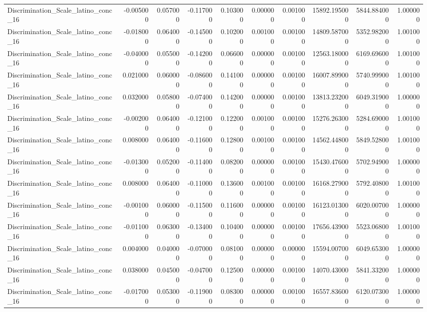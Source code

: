 \begin{table}
\begin{tabular}{lrrrrrrrrr}
Discrimination_Scale_latino_conc_16 & -0.005000 & 0.057000 & -0.117000 & 0.103000 & 0.000000 & 0.001000 & 15892.195000 & 5844.884000 & 1.000000 \\
Discrimination_Scale_latino_conc_16 & -0.018000 & 0.064000 & -0.145000 & 0.102000 & 0.001000 & 0.001000 & 14809.587000 & 5352.982000 & 1.001000 \\
Discrimination_Scale_latino_conc_16 & -0.040000 & 0.055000 & -0.142000 & 0.066000 & 0.000000 & 0.001000 & 12563.180000 & 6169.696000 & 1.001000 \\
Discrimination_Scale_latino_conc_16 & 0.021000 & 0.060000 & -0.086000 & 0.141000 & 0.000000 & 0.001000 & 16007.899000 & 5740.999000 & 1.001000 \\
Discrimination_Scale_latino_conc_16 & 0.032000 & 0.058000 & -0.074000 & 0.142000 & 0.000000 & 0.001000 & 13813.232000 & 6049.319000 & 1.000000 \\
Discrimination_Scale_latino_conc_16 & -0.002000 & 0.064000 & -0.121000 & 0.122000 & 0.001000 & 0.001000 & 15276.263000 & 5284.690000 & 1.001000 \\
Discrimination_Scale_latino_conc_16 & 0.008000 & 0.064000 & -0.116000 & 0.128000 & 0.001000 & 0.001000 & 14562.448000 & 5849.528000 & 1.001000 \\
Discrimination_Scale_latino_conc_16 & -0.013000 & 0.052000 & -0.114000 & 0.082000 & 0.000000 & 0.001000 & 15430.476000 & 5702.949000 & 1.000000 \\
Discrimination_Scale_latino_conc_16 & 0.008000 & 0.064000 & -0.110000 & 0.136000 & 0.001000 & 0.001000 & 16168.279000 & 5792.408000 & 1.001000 \\
Discrimination_Scale_latino_conc_16 & -0.001000 & 0.060000 & -0.115000 & 0.116000 & 0.000000 & 0.001000 & 16123.013000 & 6020.007000 & 1.000000 \\
Discrimination_Scale_latino_conc_16 & -0.011000 & 0.063000 & -0.134000 & 0.104000 & 0.000000 & 0.001000 & 17656.439000 & 5523.068000 & 1.001000 \\
Discrimination_Scale_latino_conc_16 & 0.004000 & 0.040000 & -0.070000 & 0.081000 & 0.000000 & 0.000000 & 15594.007000 & 6049.653000 & 1.000000 \\
Discrimination_Scale_latino_conc_16 & 0.038000 & 0.045000 & -0.047000 & 0.125000 & 0.000000 & 0.001000 & 14070.430000 & 5841.332000 & 1.000000 \\
Discrimination_Scale_latino_conc_16 & -0.017000 & 0.053000 & -0.119000 & 0.083000 & 0.000000 & 0.001000 & 16557.836000 & 6120.073000 & 1.000000 \\

\end{tabular}
\end{table}
